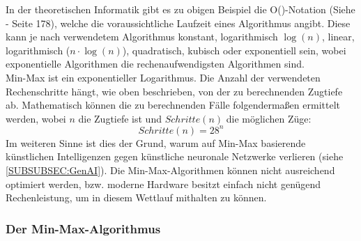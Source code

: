 \documentclass[12pt,a4paper]{article}
\begin{document}
In der theoretischen Informatik gibt es zu obigen Beispiel die O()-Notation (Siehe \cite{pragmatic} - Seite 178), welche die voraussichtliche Laufzeit eines Algorithmus angibt. Diese kann je nach verwendetem Algorithmus konstant, logarithmisch $\log(n)$, linear, logarithmisch ($n \cdot \log(n)$), quadratisch, kubisch oder exponentiell sein, wobei exponentielle Algorithmen die rechenaufwendigsten Algorithmen sind. \\
Min-Max ist ein exponentieller Logarithmus. Die Anzahl der verwendeten Rechenschritte hängt, wie oben beschrieben, von der zu berechnenden Zugtiefe ab. Mathematisch können die zu berechnenden Fälle folgendermaßen ermittelt werden, wobei $n$ die Zugtiefe ist und $Schritte(n)$ die möglichen Züge:
\[Schritte(n) = 28^n\]
Im weiteren Sinne ist dies der Grund, warum auf Min-Max basierende künstlichen Intelligenzen gegen künstliche neuronale Netzwerke verlieren (siehe \ref{SUBSUBSEC:GenAI}). Die Min-Max-Algorithmen können nicht ausreichend optimiert werden, bzw. moderne Hardware besitzt einfach nicht genügend Rechenleistung, um in diesem Wettlauf mithalten zu können. \\

\newpage
\subsubsection{Der Min-Max-Algorithmus}
\label{SUBSUBSEC:MinMax}
\end{document}
